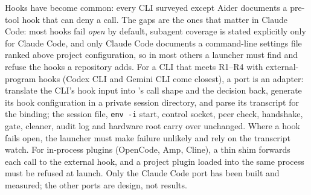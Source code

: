 Hooks have become common: every CLI surveyed except Aider documents a
pre-tool hook that can deny a call. The gaps are the ones that matter in
Claude Code: most hooks fail \emph{open} by default, subagent coverage is
stated explicitly only for Claude Code, and only Claude Code documents a
command-line settings file ranked above project configuration, so in
most others a launcher must find and refuse the hooks a repository adds.
For a CLI that meets R1--R4 with external-program hooks (Codex CLI and
Gemini CLI come closest), a port is an adapter: translate the CLI's hook
input into \sys{}'s call shape and the decision back, generate its hook
configuration in a private session directory, and parse its transcript
for the binding; the session file, \texttt{env -i} start, control
socket, peer check, handshake, gate, cleaner, audit log and hardware
root carry over unchanged. Where a hook fails open, the launcher must
make failure unlikely and rely on the transcript watch. For in-process
plugins (OpenCode, Amp, Cline), a thin shim forwards each call to the
external hook, and a project plugin loaded into the same process must be
refused at launch. Only the Claude Code port has been built and
measured; the other ports are design, not results.
